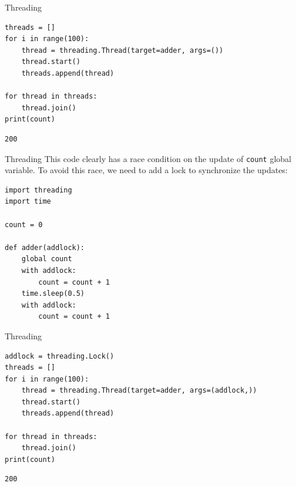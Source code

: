 \documentclass[xcolor=dvipsnames, 10pt, presentation,aspectratio=169]{beamer}
\begin{document}
\begin{frame}[label={sec:org81dc2a6},fragile]{Threading}
 \lstset{language=Python,label= ,caption= ,captionpos=b,numbers=none}
\begin{lstlisting}
threads = []
for i in range(100):
    thread = threading.Thread(target=adder, args=())
    thread.start()
    threads.append(thread)

for thread in threads:
    thread.join()
print(count)
\end{lstlisting}

\begin{verbatim}
200
\end{verbatim}
\end{frame}
\begin{frame}[label={sec:org1172f23},fragile]{Threading}
 This code clearly has a race condition on the update of \texttt{count} global
variable. To avoid this race, we need to add a lock to synchronize the
updates:
\lstset{language=Python,label= ,caption= ,captionpos=b,numbers=none}
\begin{lstlisting}
import threading
import time

count = 0

def adder(addlock):
    global count
    with addlock:
        count = count + 1
    time.sleep(0.5)
    with addlock:
        count = count + 1
\end{lstlisting}
\end{frame}
\begin{frame}[label={sec:org7b848e1},fragile]{Threading}
 \lstset{language=Python,label= ,caption= ,captionpos=b,numbers=none}
\begin{lstlisting}
addlock = threading.Lock()
threads = []
for i in range(100):
    thread = threading.Thread(target=adder, args=(addlock,))
    thread.start()
    threads.append(thread)

for thread in threads:
    thread.join()
print(count)
\end{lstlisting}

\begin{verbatim}
200
\end{verbatim}
\end{frame}
\end{document}
